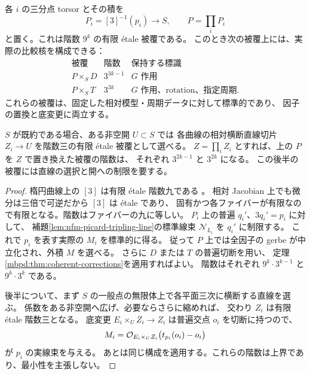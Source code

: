 \begin{proposition}[三分点による標準被覆と横断切片による被覆]
\label{mbpd:prop:finite-covers}
各 $i$ の三分点 torsor とその積を
\[
 P_i=[3]^{-1}(p_i)\longrightarrow S,
 \qquad P=\prod_i P_i
\]
と置く。これは階数 $9^k$ の有限 \'etale 被覆である。
このとき次の被覆上には、実際の比較核を構成できる：
\[
 \begin{array}{c|c|c}
  \text{被覆} & \text{階数} & \text{保持する標識}\\ \hline
  P\times_SD & 3^{3k-1} & G\text{ 作用}\\
  P\times_ST & 3^{3k} & G\text{ 作用、rotation、指定周期}.
 \end{array}
\]
これらの被覆は、固定した相対模型・周期データに対して標準的であり、
因子の置換と底変更に両立する。

$S$ が既約である場合、ある非空開 $U\subset S$ では
各曲線の相対横断直線切片 $Z_i\to U$ を階数三の有限 \'etale 被覆として選べる。
$Z=\prod_i Z_i$ とすれば、上の $P$ を $Z$ で置き換えた被覆の階数は、
それぞれ $3^{2k-1}$ と $3^{2k}$ になる。
この後半の被覆には直線の選択と開への制限を要する。
\end{proposition}
\begin{proof}
楕円曲線上の $[3]$ は有限 \'etale 階数九である
\cite{NFMStacksMultiplication}。
相対 Jacobian 上でも微分は三倍で可逆だから $[3]$ は \'etale であり、
固有かつ各ファイバーが有限なので有限となる。階数はファイバーの九に等しい。
$P_i$ 上の普遍 $q_i'$、$3q_i'=p_i$ に対して、
補題\ref{lem:nfm-picard-tripling-line}の標準線束
$\mathscr N_{L_i}$ を $q_i'$ に制限する。
これで $p_i$ を表す実際の $M_i$ を標準的に得る。
従って $P$ 上では全因子の gerbe が中立化され、外積 $M$ を選べる。
さらに $D$ または $T$ の普遍切断を用い、
定理\ref{mbpd:thm:coherent-corrections}を適用すればよい。
階数はそれぞれ $9^k\cdot3^{k-1}$ と $9^k\cdot3^k$ である。

後半について、まず $S$ の一般点の無限体上で各平面三次に横断する直線を選ぶ。
係数をある非空開へ広げ、必要ならさらに縮めれば、
交わり $Z_i$ は有限 \'etale 階数三となる。
底変更 $E_i\times_UZ_i\to Z_i$ は普遍交点 $o_i$ を切断に持つので、
\[
 M_i=\mathcal O_{E_i\times_UZ_i}\bigl(t_{p_i}(o_i)-o_i\bigr)
\]
が $p_i$ の実線束を与える。
あとは同じ構成を適用する。これらの階数は上界であり、最小性を主張しない。
\end{proof}

